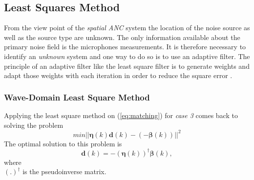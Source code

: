 \subsection{Least Squares Method}
From the view point of the \textit{spatial ANC} system the location of the noise source as well as the source type are unknown. The only information available about the primary noise field is the microphones measurements. It is therefore necessary to identify an \textit{unknown} system and one way to do so is to use an adaptive filter. The principle of an adaptive filter like the least square filter is to generate weights and adapt those weights with each iteration in order to reduce the square error \cite{Louv1984}.
\subsubsection{Wave-Domain Least Square Method}
Applying the least square method on (\ref{eq:matching}) for \textit{case 3} comes back to solving the problem
\begin{equation}
    min||\boldsymbol{\eta}(k)\boldsymbol{d}(k)-(-\boldsymbol{\beta}(k))||^2
\end{equation}
The optimal solution to this problem is \cite{Zhang2019}
\begin{equation}
    \boldsymbol{d}(k) = -(\boldsymbol{\eta}(k))^\dagger\boldsymbol{\beta}(k),
\end{equation}
where\\
$(.)^\dagger$ is the pseudoinverse matrix.